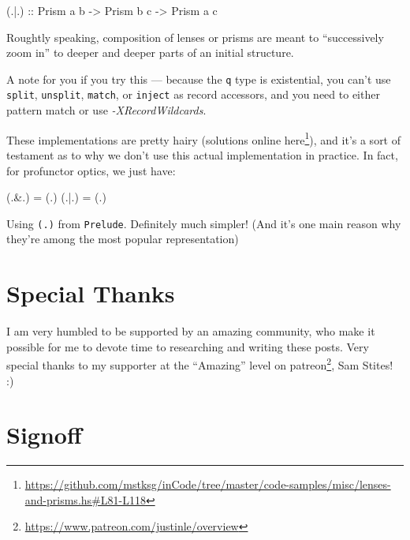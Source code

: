 \documentclass[]{article}
\newenvironment{Shaded}{}{}
\newcommand{\DataTypeTok}[1]{\textcolor[rgb]{0.56,0.13,0.00}{#1}}
\newcommand{\NormalTok}[1]{#1}
\newcommand{\OperatorTok}[1]{\textcolor[rgb]{0.40,0.40,0.40}{#1}}
\newcommand{\OtherTok}[1]{\textcolor[rgb]{0.00,0.44,0.13}{#1}}
\renewcommand{\href}[2]{#2\footnote{\url{#1}}}
\begin{document}
\begin{itemize}
\begin{Shaded}
\begin{Highlighting}[]
\OtherTok{(.|.) ::} \DataTypeTok{Prism\textquotesingle{}}\NormalTok{ a b}
      \OtherTok{{-}\textgreater{}} \DataTypeTok{Prism\textquotesingle{}}\NormalTok{ b c}
      \OtherTok{{-}\textgreater{}} \DataTypeTok{Prism\textquotesingle{}}\NormalTok{ a c}
\end{Highlighting}
\end{Shaded}

  Roughtly speaking, composition of lenses or prisms are meant to ``successively
  zoom in'' to deeper and deeper parts of an initial structure.

  A note for you if you try this --- because the \texttt{q} type is existential,
  you can't use \texttt{split}, \texttt{unsplit}, \texttt{match}, or
  \texttt{inject} as record accessors, and you need to either pattern match or
  use \emph{-XRecordWildcards}.

  These implementations are pretty hairy (solutions
  \href{https://github.com/mstksg/inCode/tree/master/code-samples/misc/lenses-and-prisms.hs\#L81-L118}{online
  here}), and it's a sort of testament as to why we don't use this actual
  implementation in practice. In fact, for profunctor optics, we just have:

\begin{Shaded}
\begin{Highlighting}[]
\NormalTok{(}\OperatorTok{.\&.}\NormalTok{) }\OtherTok{=}\NormalTok{ (}\OperatorTok{.}\NormalTok{)}
\NormalTok{(}\OperatorTok{.|.}\NormalTok{) }\OtherTok{=}\NormalTok{ (}\OperatorTok{.}\NormalTok{)}
\end{Highlighting}
\end{Shaded}

  Using \texttt{(.)} from \texttt{Prelude}. Definitely much simpler! (And it's
  one main reason why they're among the most popular representation)
\end{itemize}

\section{Special Thanks}\label{special-thanks}

I am very humbled to be supported by an amazing community, who make it possible
for me to devote time to researching and writing these posts. Very special
thanks to my supporter at the ``Amazing'' level on
\href{https://www.patreon.com/justinle/overview}{patreon}, Sam Stites! :)

\section{Signoff}\label{signoff}
\end{document}
